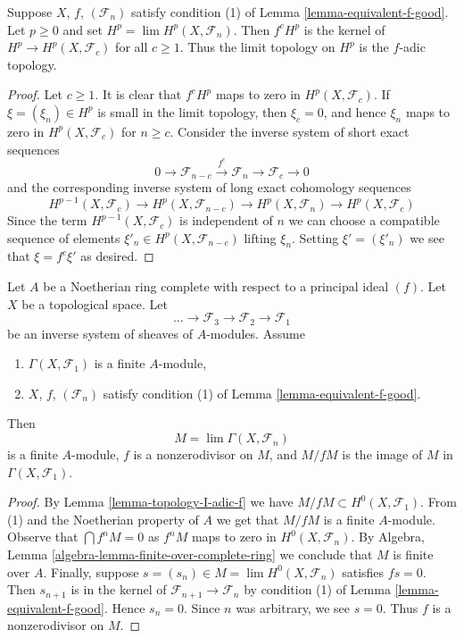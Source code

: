 \begin{lemma}
\label{lemma-topology-I-adic-f}
Suppose $X$, $f$, $(\mathcal{F}_n)$ satisfy condition (1) of
Lemma \ref{lemma-equivalent-f-good}. Let $p \geq 0$ and set
$H^p = \lim H^p(X, \mathcal{F}_n)$.
Then $f^cH^p$ is the kernel of $H^p \to H^p(X, \mathcal{F}_c)$ for all
$c \geq 1$. Thus the limit topology on $H^p$ is the $f$-adic topology.
\end{lemma}

\begin{proof}
Let $c \geq 1$. It is clear that $f^c H^p$ maps to zero in
$H^p(X, \mathcal{F}_c)$. If $\xi = (\xi_n) \in H^p$ is small in the
limit topology, then $\xi_c = 0$, and hence $\xi_n$
maps to zero in $H^p(X, \mathcal{F}_c)$ for $n \geq c$.
Consider the inverse system of short exact sequences
$$
0 \to \mathcal{F}_{n - c} \xrightarrow{f^c} \mathcal{F}_n \to
\mathcal{F}_c \to 0
$$
and the corresponding inverse system of long exact cohomology sequences
$$
H^{p - 1}(X, \mathcal{F}_c) \to
H^p(X, \mathcal{F}_{n - c}) \to
H^p(X, \mathcal{F}_n) \to
H^p(X, \mathcal{F}_c)
$$
Since the term $H^{p - 1}(X, \mathcal{F}_c)$ is independent of
$n$ we can choose a compatible sequence of elements
$\xi'_n \in H^p(X, \mathcal{F}_{n - c})$
lifting $\xi_n$. Setting $\xi' = (\xi'_n)$ we see that $\xi = f^c \xi'$
as desired.
\end{proof}

\begin{lemma}
\label{lemma-limit-finite}
Let $A$ be a Noetherian ring complete with respect to a principal ideal $(f)$.
Let $X$ be a topological space. Let
$$
\ldots \to \mathcal{F}_3 \to \mathcal{F}_2 \to \mathcal{F}_1
$$
be an inverse system of sheaves of $A$-modules. Assume
\begin{enumerate}
\item $\Gamma(X, \mathcal{F}_1)$ is a finite $A$-module,
\item $X$, $f$, $(\mathcal{F}_n)$ satisfy condition (1) of
Lemma \ref{lemma-equivalent-f-good}.
\end{enumerate}
Then
$$
M = \lim \Gamma(X, \mathcal{F}_n)
$$
is a finite $A$-module, $f$ is a nonzerodivisor on $M$, and
$M/fM$ is the image of $M$ in $\Gamma(X, \mathcal{F}_1)$.
\end{lemma}

\begin{proof}
By Lemma \ref{lemma-topology-I-adic-f} we have
$M/fM \subset H^0(X, \mathcal{F}_1)$. From (1) and the Noetherian
property of $A$ we get that $M/fM$ is a finite $A$-module.
Observe that $\bigcap f^nM = 0$ as $f^nM$ maps to zero in
$H^0(X, \mathcal{F}_n)$. By
Algebra, Lemma \ref{algebra-lemma-finite-over-complete-ring}
we conclude that $M$ is finite over $A$.
Finally, suppose $s = (s_n) \in M = \lim H^0(X, \mathcal{F}_n)$
satisfies $fs = 0$. Then $s_{n + 1}$ is in the kernel of
$\mathcal{F}_{n + 1} \to \mathcal{F}_n$ by condition (1) of
Lemma \ref{lemma-equivalent-f-good}.
Hence $s_n = 0$. Since $n$ was arbitrary, we see $s = 0$.
Thus $f$ is a nonzerodivisor on $M$.
\end{proof}


